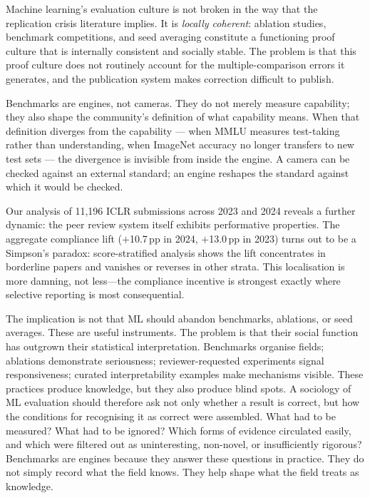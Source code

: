 \documentclass{article}
\begin{document}
Machine learning's evaluation culture is not broken in the way that the replication crisis literature implies. It is \textit{locally coherent}: ablation studies, benchmark competitions, and seed averaging constitute a functioning proof culture that is internally consistent and socially stable. The problem is that this proof culture does not routinely account for the multiple-comparison errors it generates, and the publication system makes correction difficult to publish.

Benchmarks are engines, not cameras. They do not merely measure capability; they also shape the community's definition of what capability means. When that definition diverges from the capability --- when MMLU measures test-taking rather than understanding, when ImageNet accuracy no longer transfers to new test sets --- the divergence is invisible from inside the engine. A camera can be checked against an external standard; an engine reshapes the standard against which it would be checked.

Our analysis of 11,196 ICLR submissions across 2023 and 2024 reveals a further dynamic: the peer review system itself exhibits performative properties. The aggregate compliance lift ($+$10.7\,pp in 2024, $+$13.0\,pp in 2023) turns out to be a Simpson's paradox: score-stratified analysis shows the lift concentrates in borderline papers and vanishes or reverses in other strata. This localisation is more damning, not less---the compliance incentive is strongest exactly where selective reporting is most consequential.

The implication is not that ML should abandon benchmarks, ablations, or seed averages. These are useful instruments. The problem is that their social function has outgrown their statistical interpretation. Benchmarks organise fields; ablations demonstrate seriousness; reviewer-requested experiments signal responsiveness; curated interpretability examples make mechanisms visible. These practices produce knowledge, but they also produce blind spots. A sociology of ML evaluation should therefore ask not only whether a result is correct, but how the conditions for recognising it as correct were assembled. What had to be measured? What had to be ignored? Which forms of evidence circulated easily, and which were filtered out as uninteresting, non-novel, or insufficiently rigorous? Benchmarks are engines because they answer these questions in practice. They do not simply record what the field knows. They help shape what the field treats as knowledge.
\end{document}
